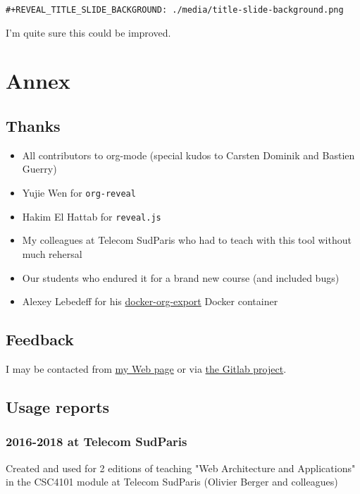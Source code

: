 \documentclass[a4paper]{article}
\begin{document}
\begin{verbatim}
#+REVEAL_TITLE_SLIDE_BACKGROUND: ./media/title-slide-background.png
\end{verbatim}

I'm quite sure this could be improved.


\section{Annex}
\label{sec:org13a117e}

\subsection{Thanks}
\label{sec:org2da0baf}

\begin{itemize}
\item All contributors to org-mode (special kudos to Carsten Dominik and Bastien Guerry)
\item Yujie Wen for \texttt{org-reveal}
\item Hakim El Hattab for \texttt{reveal.js}
\item My colleagues at Telecom SudParis who had to teach with this tool without much rehersal
\item Our students who endured it for a brand new course (and included bugs)
\item Alexey Lebedeff for his
\href{https://github.com/binarin/docker-org-export}{docker-org-export}
Docker container
\end{itemize}

\subsection{Feedback}
\label{sec:org3b006dc}

I may be contacted from \href{http://www-public.tem-tsp.eu/\~berger\_o/\#sec-3}{my Web page} or via \href{https://gitlab.com/olberger/org-teaching}{the Gitlab project}.

\subsection{Usage reports}
\label{sec:orgdf6e411}

\subsubsection{2016-2018 at Telecom SudParis}
\label{sec:org0d45f94}

Created and used for 2 editions of teaching "Web Architecture and Applications" in the CSC4101 module at Telecom SudParis (Olivier Berger and colleagues)
\end{document}
